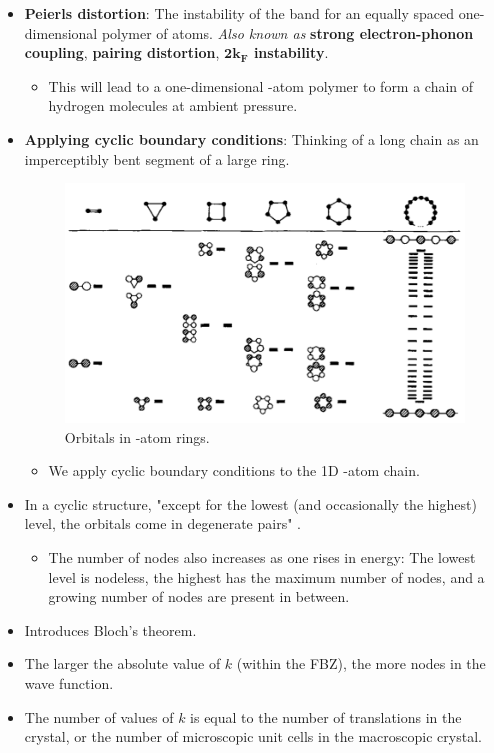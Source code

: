 \documentclass[../notes.tex]{subfiles}
\begin{document}
\begin{itemize}
    \item \textbf{Peierls distortion}: The instability of the band for an equally spaced one-dimensional polymer of  atoms. \emph{Also known as} \textbf{strong electron-phonon coupling}, \textbf{pairing distortion}, \textbf{$\bm{2k_F}$ instability}.
    \begin{itemize}
        \item This will lead to a one-dimensional -atom polymer to form a chain of hydrogen molecules at ambient pressure.
    \end{itemize}
    \item \textbf{Applying cyclic boundary conditions}: Thinking of a long chain as an imperceptibly bent segment of a large ring.
    \begin{figure}[h!]
        \centering
        \includegraphics[width=0.5\linewidth]{../ExtFiles/zooOfHAtoms.png}
        \caption{Orbitals in -atom rings.}
        \label{fig:zooOfHAtoms}
    \end{figure}
    \begin{itemize}
        \item We apply cyclic boundary conditions to the 1D -atom chain.
    \end{itemize}
    \item In a cyclic structure, "except for the lowest (and occasionally the highest) level, the orbitals come in degenerate pairs" \parencite[848]{bib:bandTheory}.
    \begin{itemize}
        \item The number of nodes also increases as one rises in energy: The lowest level is nodeless, the highest has the maximum number of nodes, and a growing number of nodes are present in between.
    \end{itemize}
    \item Introduces Bloch's theorem.
    \item The larger the absolute value of $k$ (within the FBZ), the more nodes in the wave function.
    \item The number of values of $k$ is equal to the number of translations in the crystal, or the number of microscopic unit cells in the macroscopic crystal.

\end{itemize}
\end{document}
